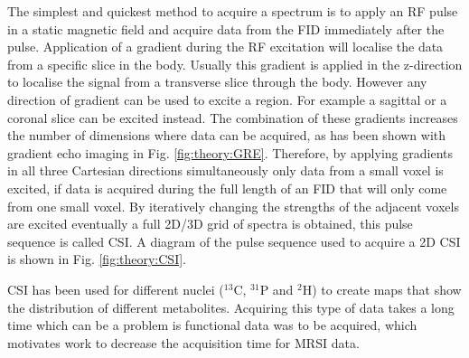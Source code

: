 The simplest and quickest method to acquire a spectrum is to apply an \ac{RF} pulse in a static magnetic field and acquire data from the FID immediately after the pulse. Application of a gradient during the \ac{RF} excitation will localise the data from a specific slice in the body. Usually this gradient is applied in the z-direction to localise the signal from a transverse slice through the body. However any direction of gradient can be used to excite a region. For example a sagittal or a coronal slice can be excited instead. The combination of these gradients increases the number of dimensions where data can be acquired, as has been shown with gradient echo imaging in Fig. \ref{fig:theory:GRE}. Therefore, by applying gradients in all three Cartesian directions simultaneously only data from a small voxel is excited, if data is acquired during the full length of an \ac{FID} that will only come from one small voxel. By iteratively changing the strengths of the adjacent voxels are excited eventually a full 2D/3D grid of spectra is obtained, this pulse sequence is called \ac{CSI}. A diagram of the pulse sequence used to acquire a 2D \ac{CSI} is shown in Fig. \ref{fig:theory:CSI}.

\ac{CSI} has been used for different nuclei ($^{13}$C, $^{31}$P and $^2$H) to create maps that show the distribution of different metabolites. Acquiring this type of data takes a long time which can be a problem is functional data was to be acquired, which motivates work to decrease the acquisition time for \ac{MRSI} data.


